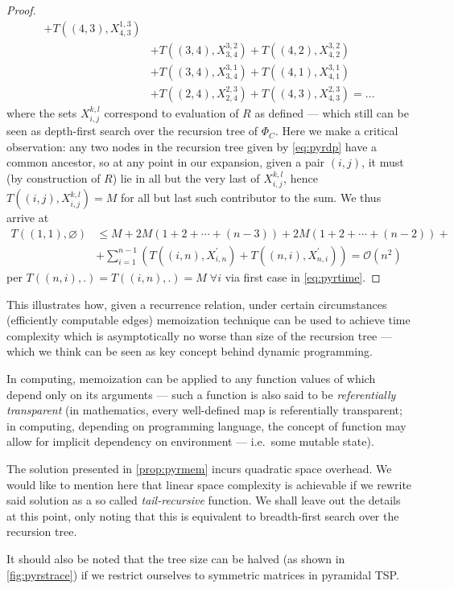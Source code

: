 \documentclass[index=totoc,bibliography=totoc]{scrartcl}
\newcommand{\annotation}[1]{\marginpar{\small\itshape\color{green}#1}}
\numberwithin{equation}{section}
\numberwithin{figure}{section}
\numberwithin{table}{section}
\let\defstyle\itshape
\begin{document}
\begin{proof}
\begin{align*}
         + T\left((4,3),X_{4,3}^{1,3}\right)
    \\ & + T\left((3,4),X_{3,4}^{3,2}\right)
         + T\left((4,2),X_{4,2}^{3,2}\right)
    \\ & + T\left((3,4),X_{3,4}^{3,1}\right)
         + T\left((4,1),X_{4,1}^{3,1}\right)
    \\ & + T\left((2,4),X_{2,4}^{2,3}\right)
         + T\left((4,3),X_{4,3}^{2,3}\right) = \ldots
  \end{align*}
  where the sets $X_{i,j}^{k,l}$ correspond to evaluation of $R$ as defined ---
  which still can be seen as depth-first search over the recursion tree of $\Phi_C$.
  Here we make a critical observation:
  any two nodes in the recursion tree given by \cref{eq:pyrdp} have a common ancestor,
  so at any point in our expansion,
  given a pair $(i,j)$, it must (by construction of $R$)
  lie in all but the very last of $X_{i,j}^{k,l}$,
  hence $T\left((i,j),X_{i,j}^{k,l}\right) = M$ for all but last such contributor to the sum.
  We thus arrive at
  \begin{align*}
    T\left((1,1),\varnothing\right) & \leq
    M + 2M \left(1 + 2 + \cdots + (n-3)\right) +
        2M \left(1 + 2 + \cdots + (n-2)\right) +
    \\
    & + \sum_{i=1}^{n-1} \left(
        T\left((i,n),X_{i,n}^\prime\right)
      + T\left((n,i),X_{n,i}^\prime\right)
    \right)
    = \mathcal{O}\left(n^2\right)
  \end{align*}
  per $T\left((n,i),.\right) = T\left((i,n),.\right) = M \; \forall i$
  via first case in \eqref{eq:pyrtime}.
\end{proof}

This illustrates how, given a recurrence relation, under certain
circumstances (efficiently computable edges) memoization technique can
be used to achieve time complexity which is asymptotically no worse than
size of the recursion tree --- which we think can be seen as key concept
behind dynamic programming.

In computing, memoization can be applied to any function values of which
depend only on its arguments --- such a function is also said to be
{\defstyle referentially transparent} (in mathematics, every well-defined
map is referentially transparent; in computing, depending on programming
language, the concept of function may allow for implicit dependency on
environment --- i.e.\ some mutable state).

\begin{remark}
  The solution presented in \cref{prop:pyrmem} incurs quadratic space
  overhead.  We would like to mention here that linear space complexity is
  achievable if we rewrite said solution as a so called {\defstyle
    tail-recursive} function.  We shall leave out the details at this
  point, only noting that this is equivalent to breadth-first search over
  the recursion tree.

  It should also be noted that the tree size can be halved 
  (as shown in \cref{fig:pyrstrace})
  if we restrict ourselves to symmetric matrices in pyramidal TSP.
\end{remark}
\end{document}
